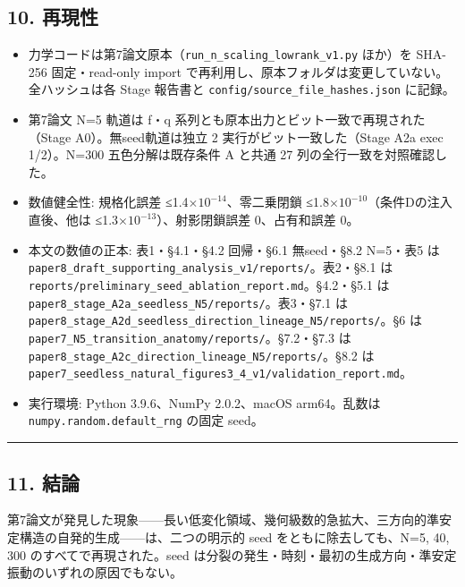 \documentclass[
  a4paper,
]{ltjsarticle}
\providecommand{\tightlist}{%
  \setlength{\itemsep}{0pt}\setlength{\parskip}{0pt}}
\begin{document}
\subsection{10. 再現性}\label{ux518dux73feux6027}

\begin{itemize}
\tightlist
\item
  力学コードは第7論文原本（\texttt{run\_n\_scaling\_lowrank\_v1.py}
  ほか）を SHA-256 固定・read-only import
  で再利用し、原本フォルダは変更していない。全ハッシュは各 Stage
  報告書と \texttt{config/source\_file\_hashes.json} に記録。
\item
  第7論文 N=5 軌道は f・q
  系列とも原本出力とビット一致で再現された（Stage A0）。無seed軌道は独立
  2 実行がビット一致した（Stage A2a exec 1/2）。N=300 五色分解は既存条件
  A と共通 27 列の全行一致を対照確認した。
\item
  数値健全性: 規格化誤差 ≤1.4\(\times10^{-14}\)、零二乗閉鎖
  ≤1.8\(\times10^{-10}\)（条件Dの注入直後、他は
  ≤1.3\(\times10^{-13}\)）、射影閉鎖誤差 0、占有和誤差 0。
\item
  本文の数値の正本: 表1・§4.1・§4.2 回帰・§6.1 無seed・§8.2 N=5・表5 は
  \texttt{paper8\_draft\_supporting\_analysis\_v1/reports/}。表2・§8.1
  は \texttt{reports/preliminary\_seed\_ablation\_report.md}。§4.2・§5.1
  は \texttt{paper8\_stage\_A2a\_seedless\_N5/reports/}。表3・§7.1 は
  \texttt{paper8\_stage\_A2d\_seedless\_direction\_lineage\_N5/reports/}。§6
  は \texttt{paper7\_N5\_transition\_anatomy/reports/}。§7.2・§7.3 は
  \texttt{paper8\_stage\_A2c\_direction\_lineage\_N5/reports/}。§8.2 は
  \texttt{paper7\_seedless\_natural\_figures3\_4\_v1/validation\_report.md}。
\item
  実行環境: Python 3.9.6、NumPy 2.0.2、macOS arm64。乱数は
  \texttt{numpy.random.default\_rng} の固定 seed。
\end{itemize}

\begin{center}\rule{0.5\linewidth}{0.5pt}\end{center}

\subsection{11. 結論}\label{ux7d50ux8ad6}

第7論文が発見した現象------長い低変化領域、幾何級数的急拡大、三方向的準安定構造の自発的生成------は、二つの明示的
seed をともに除去しても、N=5, 40, 300 のすべてで再現された。seed
は分裂の発生・時刻・最初の生成方向・準安定振動のいずれの原因でもない。
\end{document}
